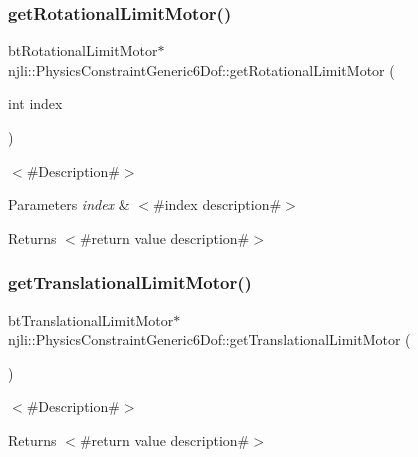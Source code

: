 \subsubsection{\texorpdfstring{get\+Rotational\+Limit\+Motor()}{getRotationalLimitMotor()}}
{\footnotesize\ttfamily bt\+Rotational\+Limit\+Motor$\ast$ njli\+::\+Physics\+Constraint\+Generic6\+Dof\+::get\+Rotational\+Limit\+Motor (\begin{DoxyParamCaption}\item[{int}]{index }\end{DoxyParamCaption})}

$<$\#\+Description\#$>$


\begin{DoxyParams}{Parameters}
{\em index} & $<$\#index description\#$>$\\
\hline
\end{DoxyParams}
\begin{DoxyReturn}{Returns}
$<$\#return value description\#$>$ 
\end{DoxyReturn}
\mbox{\label{classnjli_1_1_physics_constraint_generic6_dof_a5a05d447a6c149310f93ce8879827ecd}} 
\subsubsection{\texorpdfstring{get\+Translational\+Limit\+Motor()}{getTranslationalLimitMotor()}}
{\footnotesize\ttfamily bt\+Translational\+Limit\+Motor$\ast$ njli\+::\+Physics\+Constraint\+Generic6\+Dof\+::get\+Translational\+Limit\+Motor (\begin{DoxyParamCaption}{ }\end{DoxyParamCaption})}

$<$\#\+Description\#$>$

\begin{DoxyReturn}{Returns}
$<$\#return value description\#$>$ 
\end{DoxyReturn}
\mbox{\label{classnjli_1_1_physics_constraint_generic6_dof_aa3004e4d926ca03e19209b5ee79817d9}} 
